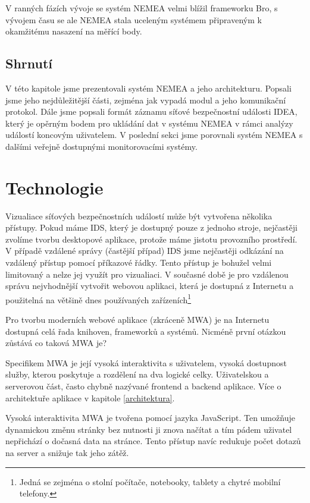 V ranných fázích vývoje se systém NEMEA velmi blížil frameworku Bro, s vývojem času se ale NEMEA stala uceleným systémem připraveným k okamžitému nasazení na měřící body.

\section{Shrnutí}

V této kapitole jsme prezentovali systém NEMEA a jeho architekturu. Popsali jsme jeho nejdůležitější části, zejména jak vypadá modul a jeho komunikační protokol. Dále jsme popsali formát záznamu síťové bezpečnostní události IDEA, který je opěrným bodem pro ukládání dat v systému NEMEA v rámci analýzy událostí koncovým uživatelem. V poslední sekci jsme porovnali systém NEMEA s dalšími veřejně dostupnými monitorovacími systémy.


\chapter{Technologie}

Vizualiace síťových bezpečnostních událostí může být vytvořena několika přístupy. Pokud máme IDS, který je dostupný pouze z jednoho stroje, nejčastěji zvolíme tvorbu desktopové aplikace, protože máme jistotu provozního prostředí. V případě vzdálené správy (častější případ) IDS jsme nejčastěji odkázání na vzdálený přístup pomocí příkazové řádky. Tento přístup je bohužel velmi limitovaný a nelze jej využít pro vizualiaci. V současné době je pro vzdálenou správu nejvhodnější vytvořit webovou aplikaci, která je dostupná z Internetu a použitelná na většině dnes používaných zařízeních\footnote{Jedná se zejména o stolní počítače, notebooky, tablety a chytré mobilní telefony.}

Pro tvorbu moderních webové aplikace (zkráceně MWA) je na Internetu dostupná celá řada knihoven, frameworků a systémů. Nicméně první otázkou zůstává co taková MWA je? 

Specifikem MWA je její vysoká interaktivita s uživatelem, vysoká dostupnost služby, kterou poskytuje a rozdělení na dva logické celky. Uživatelskou a serverovou část, často chybně nazývané frontend a backend aplikace. Více o architektuře aplikace v kapitole \ref{architektura}.

Vysoká interaktivita MWA je tvořena pomocí jazyka JavaScript. Ten umožňuje dynamickou změnu stránky bez nutnosti ji znova načítat a tím pádem uživatel nepřichází o dočasná data na stránce. Tento přístup navíc redukuje počet dotazů na server a snižuje tak jeho zátěž.

